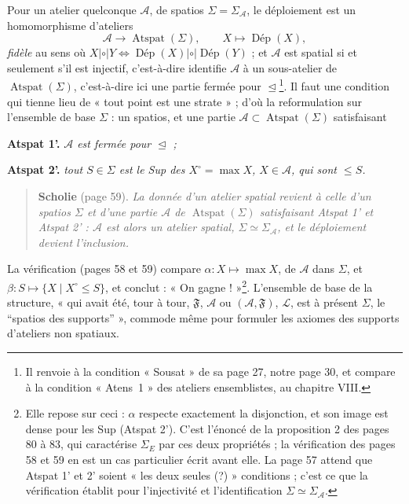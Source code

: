 \documentclass[11pt,a4paper]{article}
\begin{document}
Pour un atelier quelconque $\mathcal{A}$, de spatios $\Sigma = \Sigma_{\mathcal{A}}$,
le déploiement est un homomorphisme d'ateliers
\[
\mathcal{A} \longrightarrow \operatorname{Atspat}(\Sigma), \qquad X \longmapsto
\operatorname{\text{Dép}}(X),
\]
\emph{fidèle} au sens où $X \mathrel{|\circ|} Y \iff
\operatorname{\text{Dép}}(X) \mathrel{|\circ|} \operatorname{\text{Dép}}(Y)$ ;
et $\mathcal{A}$ est spatial si et seulement s'il est injectif, c'est-à-dire
identifie $\mathcal{A}$ à un sous-atelier de $\operatorname{Atspat}(\Sigma)$,
c'est-à-dire ici une partie fermée pour $\trianglelefteq$\footnote{Il renvoie à la condition
« Sousat » de sa page 27, notre page 30, et compare à la condition « Atens~1 »
des ateliers ensemblistes, au chapitre VIII.}. Il faut une condition qui tienne
lieu de « tout point est une strate » ; d'où la reformulation sur l'ensemble de
base $\Sigma$ : un spatios, et une partie $\mathcal{A} \subset
\operatorname{Atspat}(\Sigma)$ satisfaisant

\textbf{Atspat 1'.} \emph{$\mathcal{A}$ est fermée pour $\trianglelefteq$ ;}

\textbf{Atspat 2'.} \emph{tout $S \in \Sigma$ est le Sup des $X^{\circ} = \max X$,
$X \in \mathcal{A}$, qui sont $\leq S$.}

\begin{quote}
\textbf{Scholie} (page 59). \emph{La donnée d'un atelier spatial revient à celle
d'un spatios $\Sigma$ et d'une partie $\mathcal{A}$ de
$\operatorname{Atspat}(\Sigma)$ satisfaisant Atspat 1' et Atspat 2' : $\mathcal{A}$
est alors un atelier spatial, $\Sigma \simeq \Sigma_{\mathcal{A}}$, et le
déploiement devient l'inclusion.}
\end{quote}

La vérification (pages 58 et 59) compare $\alpha : X \mapsto \max X$, de
$\mathcal{A}$ dans $\Sigma$, et $\beta : S \mapsto \{X \mid X^{\circ} \leq S\}$,
et conclut : « On gagne ! »\footnote{Elle repose sur ceci : $\alpha$ respecte
exactement la disjonction, et son image est dense pour les Sup (Atspat 2'). C'est
l'énoncé de la proposition 2 des pages 80 à 83, qui caractérise
$\Sigma_{E}$ par ces deux propriétés ; la vérification des pages 58 et 59 en est
un cas particulier écrit avant elle. La page 57 attend que Atspat 1' et 2' soient
« les deux seules (?) » conditions ; c'est ce que la vérification établit pour
l'injectivité et l'identification $\Sigma \simeq \Sigma_{\mathcal{A}}$.}.
L'ensemble de base de la structure, « qui avait été, tour à tour, $\mathfrak{F}$,
$\mathcal{A}$ ou $(\mathcal{A}, \mathfrak{F})$, $\mathcal{L}$, est à présent
$\Sigma$, le “spatios des supports” », commode même pour formuler les axiomes
des supports d'ateliers non spatiaux.
\end{document}
